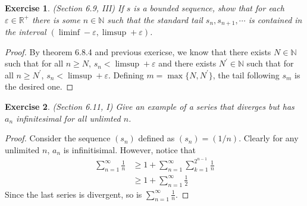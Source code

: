 \documentclass[a4paper, 11pt, openany]{book}
\theoremstyle{plain}
\newtheorem{exercise}{Exercise}[chapter]
\theoremstyle{plain}
\newcommand{\N}{\mathbb{N}}
\newcommand{\R}{\mathbb{R}}
\newcommand{\p}{\prime}
\newcommand{\ep}{\varepsilon}
\begin{document}
  \begin{exercise}
    (Section 6.9, III)
    If $s$ is a bounded sequence, show that for each $\ep \in \R^+$ there is some $n \in \N$ such that the standard tail $s_n, s_{n+1}, \cdots$ is contained in the interval $(\liminf-\ep, \limsup+\ep)$.
  \end{exercise}
  \begin{proof}
    By theorem 6.8.4 and previous exericse, we know that there exists $N \in \N$ such that for all $n\geq N$, $s_n<\limsup+\ep$ and there exists $N^\p \in \N$ such that for all $n\geq N^\p$, $s_n<\limsup+\ep$. Defining $m=\max\{N, N^\p\}$, the tail following $s_m$ is the desired one.
  \end{proof}

  \begin{exercise}
    (Section 6.11, I)
    Give an example of a series that diverges but has $a_n$ infinitesimal for all unlimted $n$.
  \end{exercise}
  \begin{proof}
    Consider the sequence $(s_n)$ defined as $(s_n)=(1/n)$. Clearly for any unlimited $n$, $a_n$ is infinitisimal. However, notice that 
    \begin{align*}
      \sum_{n=1}^\infty \frac{1}{n} &\geq 1+\sum_{n=1}^\infty \sum_{k=1}^{2^{n-1}} \frac{1}{n} \\
      &\geq 1+\sum_{n=1}^\infty \frac{1}{2}
    \end{align*}
    Since the last series is divergent, so is $\sum_{n=1}^\infty \frac{1}{n}$.
  \end{proof}
\end{document}

